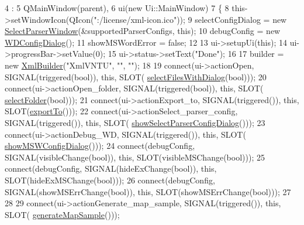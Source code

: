 \begin{DoxyCode}
4                                       :
5     QMainWindow(parent),
6     ui(\textcolor{keyword}{new} Ui::MainWindow)
7 \{
8     this->setWindowIcon(QIcon(\textcolor{stringliteral}{":/license/xml-icon.ico"}));
9     selectConfigDialog = \textcolor{keyword}{new} \hyperlink{class_select_parser_window}{SelectParserWindow}(&supportedParserConfigs, \textcolor{keyword}{this});
10     debugConfig = \textcolor{keyword}{new} \hyperlink{class_w_d_config_dialog}{WDConfigDialog}();
11     showMSWordError = \textcolor{keyword}{false};
12 
13     ui->setupUi(\textcolor{keyword}{this});
14     ui->progressBar->setValue(0);
15     ui->status->setText(\textcolor{stringliteral}{"Done"});
16 
17     builder = \textcolor{keyword}{new} \hyperlink{class_xml_builder}{XmlBuilder}(\textcolor{stringliteral}{"XmlVNTU"}, \textcolor{stringliteral}{""}, \textcolor{stringliteral}{""});
18 
19     connect(ui->actionOpen, SIGNAL(triggered(\textcolor{keywordtype}{bool})), \textcolor{keyword}{this}, SLOT(
      \hyperlink{class_main_window_ae454fa786ec097491d801d8bc7d3824c}{selectFilesWithDialog}(\textcolor{keywordtype}{bool})));
20     connect(ui->actionOpen\_folder, SIGNAL(triggered(\textcolor{keywordtype}{bool})), \textcolor{keyword}{this}, SLOT(
      \hyperlink{class_main_window_ac7e1b1634d7b3e15641ca73422a4648d}{selectFolder}(\textcolor{keywordtype}{bool})));
21     connect(ui->actionExport\_to, SIGNAL(triggered()), \textcolor{keyword}{this}, SLOT(\hyperlink{class_main_window_abcf1ecfd08a6967a28853153281ce4d8}{exportTo}()));
22     connect(ui->actionSelect\_parser\_config, SIGNAL(triggered()), \textcolor{keyword}{this}, SLOT(
      \hyperlink{class_main_window_ab8d462abbdc0627822672281f8e07d50}{showSelectParserConfigDialog}()));
23     connect(ui->actionDebug\_WD, SIGNAL(triggered()), \textcolor{keyword}{this}, SLOT(
      \hyperlink{class_main_window_ab7a1a0cb0ab474a3fc80d17bf37c6b47}{showMSWConfigDialog}()));
24     connect(debugConfig, SIGNAL(visibleChange(\textcolor{keywordtype}{bool})), \textcolor{keyword}{this}, SLOT(visibleMSChange(\textcolor{keywordtype}{bool})));
25     connect(debugConfig, SIGNAL(hideExChange(\textcolor{keywordtype}{bool})), \textcolor{keyword}{this}, SLOT(hideExMSChange(\textcolor{keywordtype}{bool})));
26     connect(debugConfig, SIGNAL(showMSErrChange(\textcolor{keywordtype}{bool})), \textcolor{keyword}{this}, SLOT(showMSErrChange(\textcolor{keywordtype}{bool})));
27 
28 
29     connect(ui->actionGenerate\_map\_sample, SIGNAL(triggered()), \textcolor{keyword}{this}, SLOT(
      \hyperlink{class_main_window_addb903e5eac4179672e9825847af9be0}{generateMapSample}()));

\end{DoxyCode}
